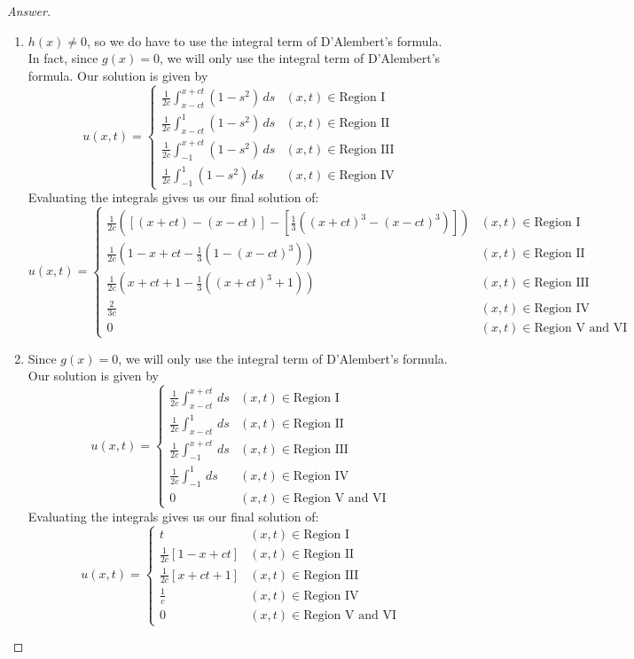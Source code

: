 \documentclass{article}
\theoremstyle{definition}
\renewcommand\qedsymbol{$\blacksquare$}
\newenvironment{ans}{\begin{proof}[Answer]\renewcommand{\qedsymbol}{}}{\end{proof}}
\begin{document}
\begin{ans}
\begin{enumerate}[(1), start = 7, resume*=answers]
    \item $h(x)\neq 0$, so we do have to use the integral term of D'Alembert's formula. In fact, since $g(x) = 0$, we will only use the integral term of D'Alembert's formula. Our solution is given by
    \[u(x,t) = \begin{cases}
        \frac{1}{2c} \int_{x-ct}^{x+ct}(1-s^2)\, ds & (x,t)\in\text{Region I}\\
        \frac{1}{2c} \int_{x-ct}^{1}(1-s^2)\, ds & (x,t)\in\text{Region II}\\
        \frac{1}{2c} \int_{-1}^{x+ct}(1-s^2)\, ds & (x,t) \in \text{Region III}\\
        \frac{1}{2c} \int_{-1}^{1}(1-s^2)\, ds & (x,t) \in \text{Region IV}
    \end{cases}\]
    Evaluating the integrals gives us our final solution of:
    \[\boxed{u(x,t) = \begin{cases}
        \frac{1}{2c}\left(\left[(x+ct) - (x-ct)\right]-\left[\frac{1}{3}((x+ct)^3 - (x-ct)^3)\right]\right)& (x,t)\in\text{Region I}\\
        \frac{1}{2c} \left( 1-x+ct-\frac{1}{3} (1 - (x-ct)^3) \right) & (x,t)\in\text{Region II}\\
        \frac{1}{2c} \left( x + ct + 1 - \frac{1}{3} ((x+ct)^3 + 1) \right) & (x,t)\in\text{Region III}\\
        \frac{2}{3c} & (x,t) \in \text{Region IV}\\
        0 & (x,t) \in \text{Region V and VI}
    \end{cases}}\]

    \item Since $g(x) = 0$, we will only use the integral term of D'Alembert's formula. Our solution is given by
     \[\boxed{u(x,t) = \begin{cases}
        \frac{1}{2c}\int_{x-ct}^{x+ct}\,ds & (x,t)\in\text{Region I}\\
        \frac{1}{2c}\int_{x-ct}^{1}\,ds & (x,t)\in\text{Region II}\\
        \frac{1}{2c}\int_{-1}^{x+ct}\,ds & (x,t) \in \text{Region III}\\
        \frac{1}{2c}\int_{-1}^{1}\,ds & (x,t)\in\text{Region IV}\\
        0 & (x,t) \in \text{Region V and VI}
    \end{cases}}\]
    Evaluating the integrals gives us our final solution of:
     \[\boxed{u(x,t) = \begin{cases}
        t & (x,t)\in\text{Region I}\\
        \frac{1}{2c}\left[1-x+ct \right] & (x,t)\in\text{Region II}\\
        \frac{1}{2c} \left[ x+ct+1 \right] & (x,t) \in \text{Region III}\\
        \frac{1}{c} & (x,t)\in\text{Region IV}\\
        0 & (x,t) \in \text{Region V and VI}
    \end{cases}}\]


\end{enumerate}
\end{ans}
\end{document}
